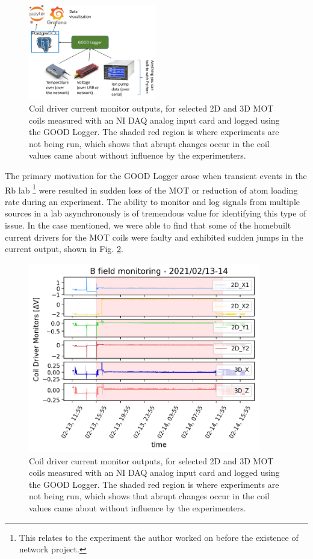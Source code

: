 \begin{figure}[!ht]
    \centering
    \includegraphics[width=0.5\textwidth]{Images/good_logger_with_postgres.png}
    \caption{Coil driver current monitor outputs, for selected 2D and 3D MOT coils measured with an NI DAQ analog input card and logged using the GOOD Logger. The shaded red region is where experiments are not being run, which shows that abrupt changes occur in the coil values came about without influence by the experimenters.}
    \label{fig:goodlogger}
\end{figure}


The primary motivation for the GOOD Logger arose when transient events in the Rb lab \footnote{This relates to the experiment the author worked on before the existence of network project.} were resulted in sudden loss of the MOT or reduction of atom loading rate during an experiment. The ability to monitor and log signals from multiple sources in a lab asynchronously is of tremendous value for identifying this type of issue. In the case mentioned, we were able to find that some of the homebuilt current drivers for the MOT coils were faulty and exhibited sudden jumps in the current output, shown in Fig. \ref{fig:coiljumps}.

\begin{figure}[!ht]
    \centering
    \includegraphics[width=0.9\textwidth]{Images/goodlogger_coil_jumps_20210213_14.pdf}
    \caption{Coil driver current monitor outputs, for selected 2D and 3D MOT coils measured with an NI DAQ analog input card and logged using the GOOD Logger. The shaded red region is where experiments are not being run, which shows that abrupt changes occur in the coil values came about without influence by the experimenters.}
    \label{fig:coiljumps}
\end{figure}



